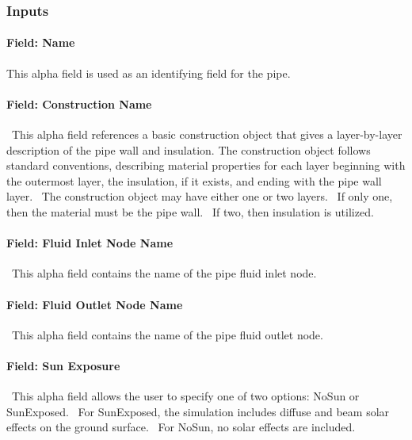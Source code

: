 \subsubsection{Inputs}\label{inputs-8-012}

\paragraph{Field: Name}\label{field-name-8-010}

This alpha field is used as an identifying field for the pipe.

\paragraph{Field: Construction Name}\label{field-construction-name-2-000}

~This alpha field references a basic construction object that gives a layer-by-layer description of the pipe wall and insulation. The construction object follows standard conventions, describing material properties for each layer beginning with the outermost layer, the insulation, if it exists, and ending with the pipe wall layer.~ The construction object may have either one or two layers.~ If only one, then the material must be the pipe wall.~ If two, then insulation is utilized.

\paragraph{Field: Fluid Inlet Node Name}\label{field-fluid-inlet-node-name-2}

~This alpha field contains the name of the pipe fluid inlet node.

\paragraph{Field: Fluid Outlet Node Name}\label{field-fluid-outlet-node-name-2}

~This alpha field contains the name of the pipe fluid outlet node.

\paragraph{Field: Sun Exposure}\label{field-sun-exposure}

~This alpha field allows the user to specify one of two options: NoSun or SunExposed.~ For SunExposed, the simulation includes diffuse and beam solar effects on the ground surface.~ For NoSun, no solar effects are included.


